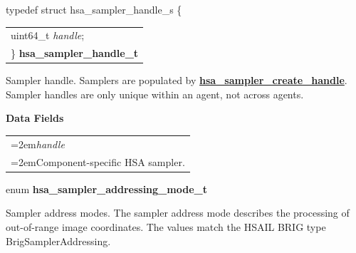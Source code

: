 \documentclass[final]{book}
\newcommand{\reffun}[1]{\textbf{#1}}
\newcommand{\reffld}[1]{\textit{#1}}
\begin{document}
\begin{appendices}
\noindent\begin{tcolorbox}[breakable,nobeforeafter,arc=0mm,colframe=white,colback=lightgray,left=0mm]
typedef struct  hsa_sampler_handle_s \{
\vspace{-3.5mm}\begin{longtable}{@{}p{\textwidth}}
\hspace{1.7em}uint64_t \reffld{handle};\\
\}  \hypertarget{group--images-1ga1ede95cd305978e23bd92b7ff8782f4f}{\textbf{hsa_sampler_handle_t}}
\end{longtable}

\end{tcolorbox}
Sampler handle. Samplers are populated by \hyperlink{group--images-1ga5d989fe4081ab79e7665788bb0f64e3f}{\reffun{hsa_sampler_create_handle}}. Sampler handles are only unique within an agent, not across agents.

\noindent\textbf{Data Fields}\\[-6mm]
\begin{longtable}{@{}>{\hangindent=2em}p{\textwidth}}
\reffld{handle}\\\hspace{2em}Component-specific HSA sampler.
\end{longtable}



\noindent\begin{tcolorbox}[nobeforeafter,arc=0mm,colframe=white,colback=lightgray,left=0mm]
enum \hypertarget{group--images-1gaaf2a640a112084fae3985158fbfd2584}{\textbf{hsa_sampler_addressing_mode_t}}
\end{tcolorbox}
Sampler address modes. The sampler address mode describes the processing of out-of-range image coordinates. The values match the HSAIL BRIG type BrigSamplerAddressing.


\end{appendices}
\end{document}
